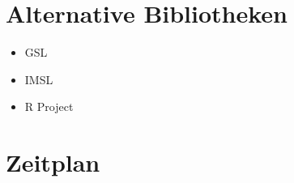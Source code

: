 \documentclass{beamer}
\begin{document}
\section{Alternative Bibliotheken}

\begin{frame}
 \begin{itemize}
  \item GSL
  \item IMSL
  \item R Project
 \end{itemize}

\end{frame}


\section{Zeitplan}
\end{document}
